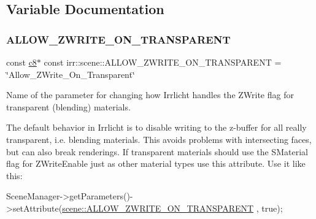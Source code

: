 \subsection{Variable Documentation}
\mbox{\label{namespaceirr_1_1scene_ab585d23bc2a3d02cd368d8bfd0b1414a}} 
\subsubsection{\texorpdfstring{A\+L\+L\+O\+W\+\_\+\+Z\+W\+R\+I\+T\+E\+\_\+\+O\+N\+\_\+\+T\+R\+A\+N\+S\+P\+A\+R\+E\+NT}{ALLOW\_ZWRITE\_ON\_TRANSPARENT}}
{\footnotesize\ttfamily const \hyperlink{namespaceirr_a9395eaea339bcb546b319e9c96bf7410}{c8}$\ast$ const irr\+::scene\+::\+A\+L\+L\+O\+W\+\_\+\+Z\+W\+R\+I\+T\+E\+\_\+\+O\+N\+\_\+\+T\+R\+A\+N\+S\+P\+A\+R\+E\+NT = \char`\"{}Allow\+\_\+\+Z\+Write\+\_\+\+On\+\_\+\+Transparent\char`\"{}}



Name of the parameter for changing how Irrlicht handles the Z\+Write flag for transparent (blending) materials. 

The default behavior in Irrlicht is to disable writing to the z-\/buffer for all really transparent, i.\+e. blending materials. This avoids problems with intersecting faces, but can also break renderings. If transparent materials should use the S\+Material flag for Z\+Write\+Enable just as other material types use this attribute. Use it like this\+: 
\begin{DoxyCode}
SceneManager->getParameters()->setAttribute(\hyperlink{namespaceirr_1_1scene_ab585d23bc2a3d02cd368d8bfd0b1414a}{scene::ALLOW\_ZWRITE\_ON\_TRANSPARENT}
      , \textcolor{keyword}{true});
\end{DoxyCode}
 \mbox{\label{namespaceirr_1_1scene_a0a190773ebdbed9f134b17d496fc526a}} 
